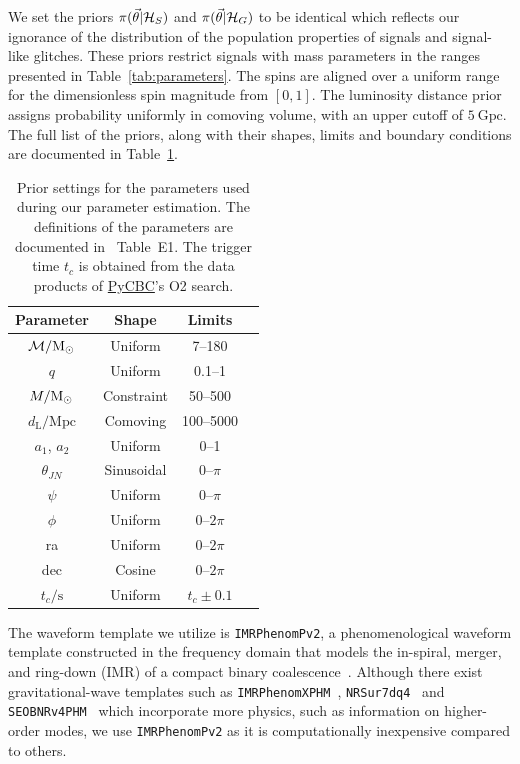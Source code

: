 \documentclass[%
 nofootinbib,
 amsmath,amssymb,
 aps,
 twocolumn,
 superscriptaddress
]{revtex4-2}
\newcommand{\imrphenomp}{{\sc \texttt{IMRPhenomPv2}}\xspace}
\newcommand{\seob}{{\sc \texttt{SEOBNRv4PHM}}\xspace}
\newcommand{\nrsur}{{\sc \texttt{NRSur7dq4}}\xspace}
\newcommand{\imrxhm}{{\sc \texttt{IMRPhenomXPHM}}\xspace}
\newcommand{\pycbc}{{\sc \href{https://pycbc.org/}{{PyCBC}}}\xspace}
\newcommand{\mathcmd}[1]{{\sc \relax\ifmmode#1\else $#1$\fi}\xspace}
\newcommand{\msun}{\mathcmd{\text{M}_\odot}}
\newcommand{\parameters}{\mathcmd{\vec{\theta}}}
\begin{document}
We set the priors $\pi(\parameters|\mathcal{H}_S)$ and $\pi(\parameters|\mathcal{H}_G)$ to be identical which reflects our ignorance of the distribution of the population properties of signals and signal-like glitches. These priors restrict signals with mass parameters in the ranges presented in Table~\ref{tab:parameters}. The spins are aligned over a uniform range for the dimensionless spin magnitude from $\left[0,1\right]$. The luminosity distance prior assigns probability uniformly in comoving volume, with an upper cutoff of $5\ \text{Gpc}$. The full list of the priors, along with their shapes, limits and boundary conditions are documented in Table~\ref{tab:priors}. 

\begin{table}
    \centering
    \caption{
    Prior settings for the parameters used during our parameter estimation. The definitions of the parameters are documented in \citet{bilby_gwtc}~Table~E1. The trigger time $t_c$ is obtained from the data products of \pycbc's O2 search. \label{tab:priors}} 
    \begin{tabular}{c c c c}
    \hline
    Parameter & Shape & Limits \\
    \hline
          $\mathcal{M}/\msun$           & Uniform & 7--180  \\
          $q$                           & Uniform & 0.1--1  \\
          $M/\msun$                     & Constraint & 50--500  \\
          $d_\mathrm{L}/\mathrm{Mpc}$   & Comoving & 100--5000  \\
          $a_1$, $a_2$                  & Uniform & 0--1  \\
          $\theta_{JN}$                 & Sinusoidal & 0--$\pi$  \\
          $\psi$                        & Uniform & 0--$\pi$  \\
          $\phi$                        & Uniform & 0--$2\pi$  \\
          ra                            & Uniform & 0--$2\pi$  \\
          dec                           & Cosine & 0--$2\pi$  \\
          $t_c/\mathrm{s}$              & Uniform & $t_c\pm0.1$  \\
    \hline
    \end{tabular}
\end{table}

The waveform template we utilize is \imrphenomp, a phenomenological waveform template constructed in the frequency domain that models the in-spiral, merger, and ring-down (IMR) of a compact binary coalescence~\citep{khan2016frequency}. Although there exist gravitational-wave templates such as \imrxhm~\cite{imrphenompxhm}, \nrsur~\cite{nrsur7dq4} and \seob~\cite{seobnrv4phm} which incorporate more physics, such as information on higher-order modes, we use \imrphenomp as it is computationally inexpensive compared to others.
\end{document}
